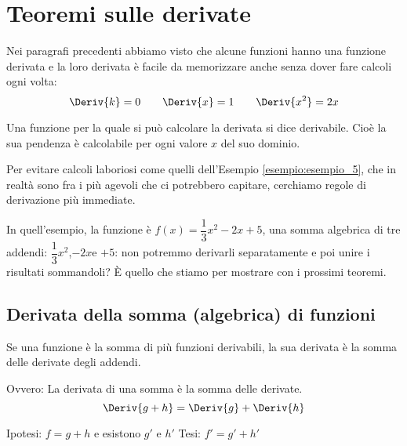 \section{Teoremi sulle derivate}
\label{sec:differenziazione_teoremi}

Nei paragrafi precedenti abbiamo visto che alcune funzioni hanno una 
funzione derivata e la loro derivata è facile da memorizzare anche senza 
dover fare calcoli ogni volta:
\[\Deriv{k}=0 \qquad 
  \Deriv{x}=1 \qquad 
  \Deriv{x^2}=2x
\]
\begin{definizione}
Una funzione per la quale si può calcolare la derivata si dice 
derivabile.
Cioè la sua pendenza è calcolabile per ogni valore \(x\) del suo dominio.
\end{definizione}

Per evitare calcoli laboriosi come quelli dell'Esempio 
\ref{esempio:esempio_5}, 
che in realtà sono fra i più agevoli che ci potrebbero capitare, 
cerchiamo regole di derivazione più immediate. 

In quell'esempio, la funzione è \(f(x)=\dfrac{1}{3}x^2-2x+5\),  una somma 
algebrica di tre addendi: \(\dfrac{1}{3}x^2\),\quad \(-2x\)\quad e\quad  
\(+5 \): non potremmo derivarli separatamente e poi unire i risultati 
sommandoli? È quello che stiamo per mostrare con i prossimi teoremi.

\subsection{Derivata della somma (algebrica) di funzioni}
\label{subsec:differenziazione_derivatasomma}
\begin{teorema}
 Se una funzione è la somma di più funzioni derivabili, la sua 
 derivata è la somma delle derivate degli addendi.
 
Ovvero: La derivata di una somma è la somma delle derivate.
\[\Deriv{g + h}=\Deriv{g}+\Deriv{h}\]
\end{teorema}
\noindent Ipotesi: \(f = g + h\) e esistono \(g'\) e \(h'\) 
\tab Tesi: \(f'=g' + h'\)

